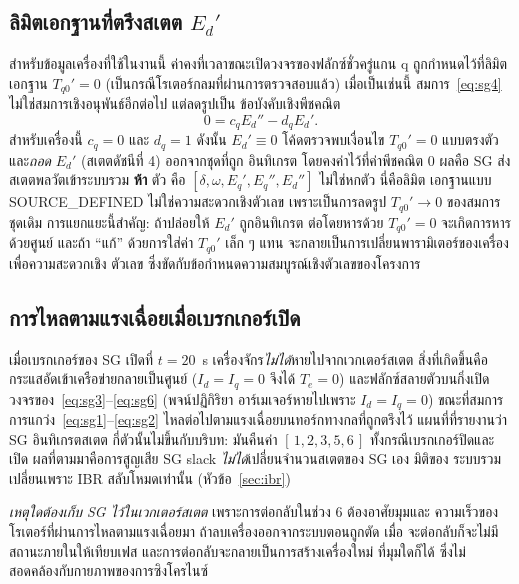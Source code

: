 \documentclass[12pt,a4paper]{article}
\begin{document}
\subsection{ลิมิตเอกฐานที่ตรึงสเตต $E_d'$}\label{sec:frozen}
สำหรับข้อมูลเครื่องที่ใช้ในงานนี้ ค่าคงที่เวลาขณะเปิดวงจรของฟลักซ์ชั่วครู่แกน q
ถูกกำหนดไว้ที่ลิมิตเอกฐาน $T_{q0}'=0$ (เป็นกรณีโรเตอร์กลมที่ผ่านการตรวจสอบแล้ว)
เมื่อเป็นเช่นนี้ สมการ~\eqref{eq:sg4} ไม่ใช่สมการเชิงอนุพันธ์อีกต่อไป แต่ลดรูปเป็น
ข้อบังคับเชิงพีชคณิต
\begin{equation}
  0 = c_q E_d'' - d_q E_d'.
\end{equation}
สำหรับเครื่องนี้ $c_q=0$ และ $d_q=1$ ดังนั้น $E_d'\equiv 0$ โค้ดตรวจพบเงื่อนไข
$T_{q0}'=0$ แบบตรงตัว และ\emph{ถอด} $E_d'$ (สเตตดัชนีที่ 4) ออกจากชุดที่ถูก
อินทิเกรต โดยคงค่าไว้ที่ค่าพีชคณิต $0$ ผลคือ SG ส่งสเตตพลวัตเข้าระบบรวม
\textbf{ห้า} ตัว คือ $[\delta,\omega,E_q',E_q'',E_d'']$ ไม่ใช่หกตัว นี่คือลิมิต
เอกฐานแบบ \textsf{SOURCE\_DEFINED} ไม่ใช่ความสะดวกเชิงตัวเลข เพราะเป็นการลดรูป
$T_{q0}'\to0$ ของสมการชุดเดิม การแยกแยะนี้สำคัญ: ถ้าปล่อยให้ $E_d'$ ถูกอินทิเกรต
ต่อโดยหารด้วย $T_{q0}'=0$ จะเกิดการหารด้วยศูนย์ และถ้า ``แก้'' ด้วยการใส่ค่า
$T_{q0}'$ เล็ก ๆ แทน จะกลายเป็นการเปลี่ยนพารามิเตอร์ของเครื่องเพื่อความสะดวกเชิง
ตัวเลข ซึ่งขัดกับข้อกำหนดความสมบูรณ์เชิงตัวเลขของโครงการ

\subsection{การไหลตามแรงเฉื่อยเมื่อเบรกเกอร์เปิด}
เมื่อเบรกเกอร์ของ SG เปิดที่ $t=20$~s เครื่องจักร\emph{ไม่ได้}หายไปจากเวกเตอร์สเตต
สิ่งที่เกิดขึ้นคือกระแสอัดเข้าเครือข่ายกลายเป็นศูนย์ ($I_d=I_q=0$ จึงได้ $T_e=0$)
และฟลักซ์สลายตัวบนกิ่งเปิดวงจรของ~\eqref{eq:sg3}--\eqref{eq:sg6} (พจน์ปฏิกิริยา
อาร์เมเจอร์หายไปเพราะ $I_d=I_q=0$) ขณะที่สมการการแกว่ง~\eqref{eq:sg1}--\eqref{eq:sg2}
ไหลต่อไปตามแรงเฉื่อยบนทอร์กทางกลที่ถูกตรึงไว้ แผนที่ที่รายงานว่า SG อินทิเกรตสเตต
กี่ตัวนั้นไม่ขึ้นกับบริบท: มันคืนค่า $[\,1,2,3,5,6\,]$ ทั้งกรณีเบรกเกอร์ปิดและเปิด
ผลที่ตามมาคือการสูญเสีย SG slack \emph{ไม่ได้}เปลี่ยนจำนวนสเตตของ SG เอง มิติของ
ระบบรวมเปลี่ยนเพราะ IBR สลับโหมดเท่านั้น (หัวข้อ~\ref{sec:ibr})

\emph{เหตุใดต้องเก็บ SG ไว้ในเวกเตอร์สเตต} เพราะการต่อกลับในช่วง 6 ต้องอาศัยมุมและ
ความเร็วของโรเตอร์ที่ผ่านการไหลตามแรงเฉื่อยมา ถ้าลบเครื่องออกจากระบบตอนถูกตัด เมื่อ
จะต่อกลับก็จะไม่มีสถานะภายในให้เทียบเฟส และการต่อกลับจะกลายเป็นการสร้างเครื่องใหม่
ที่มุมใดก็ได้ ซึ่งไม่สอดคล้องกับกายภาพของการซิงโครไนซ์

\end{document}
